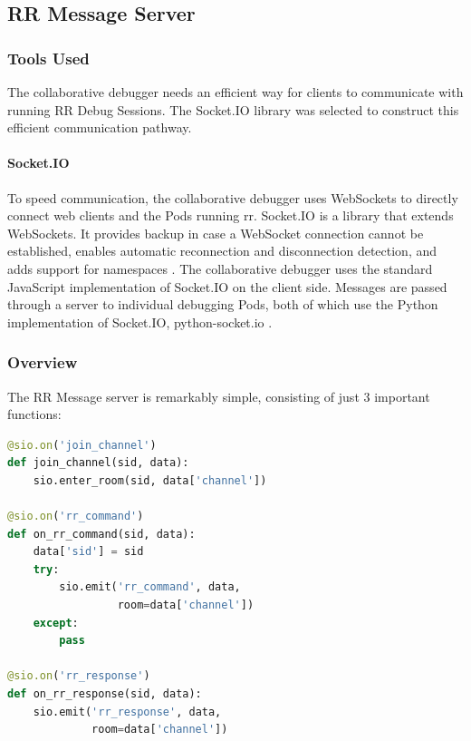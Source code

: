 \documentclass[12pt]{article}
\begin{document}
\subsection{RR Message Server}\label{rrmessageserver}

\subsubsection{Tools Used}

The collaborative debugger needs an efficient way for clients to
communicate with running RR Debug Sessions. The Socket.IO library was
selected to construct this efficient communication pathway.

\paragraph{Socket.IO}\label{socketio}

To speed communication, the collaborative debugger uses WebSockets to
directly connect web clients and the Pods running rr.  Socket.IO is a
library that extends WebSockets.  It provides backup in case a
WebSocket connection cannot be established, enables automatic
reconnection and disconnection detection, and adds support for
namespaces \cite{socketio}.  The collaborative debugger uses the
standard JavaScript implementation of Socket.IO on the client side.
Messages are passed through a server to individual debugging Pods,
both of which use the Python implementation of Socket.IO,
python-socket.io \cite{python_socketio}.

\subsubsection{Overview}

The RR Message server is remarkably simple, consisting of just 3
important functions:

\begin{lstlisting}[language=Python,basicstyle=\linespread{0.5}\ttfamily,caption={RR Message Server},captionpos=b]
@sio.on('join_channel')
def join_channel(sid, data):
    sio.enter_room(sid, data['channel'])

@sio.on('rr_command')
def on_rr_command(sid, data):
    data['sid'] = sid
    try:
        sio.emit('rr_command', data,
                 room=data['channel'])
    except:
        pass

@sio.on('rr_response')
def on_rr_response(sid, data):
    sio.emit('rr_response', data,
             room=data['channel'])
\end{lstlisting}
\end{document}
